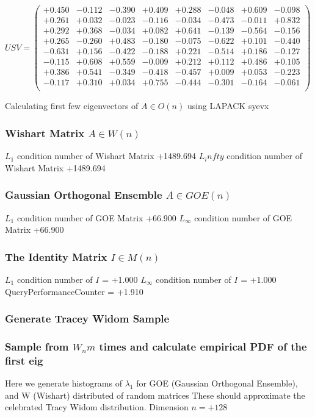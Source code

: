 \documentclass[9pt]{article}
\theoremstyle{plain}
\theoremstyle{definition}
\theoremstyle{remark}
\numberwithin{equation}{section}
\begin{document}
$U S V = \left(
\begin{array}{
cccccccc}
+0.450 & -0.112 & -0.390 & +0.409 & +0.288 & -0.048 & +0.609 & -0.098 \\
+0.261 & +0.032 & -0.023 & -0.116 & -0.034 & -0.473 & -0.011 & +0.832 \\
+0.292 & +0.368 & -0.034 & +0.082 & +0.641 & -0.139 & -0.564 & -0.156 \\
+0.265 & -0.260 & +0.483 & -0.180 & -0.075 & -0.622 & +0.101 & -0.440 \\
-0.631 & +0.156 & -0.422 & -0.188 & +0.221 & -0.514 & +0.186 & -0.127 \\
-0.115 & +0.608 & +0.559 & -0.009 & +0.212 & +0.112 & +0.486 & +0.105 \\
+0.386 & +0.541 & -0.349 & -0.418 & -0.457 & +0.009 & +0.053 & -0.223 \\
-0.117 & +0.310 & +0.034 & +0.755 & -0.444 & -0.301 & -0.164 & -0.061 \\
\end{array}
\right)$ \newline 

Calculating first few eigenvectors of $A \in O(n)$ using LAPACK syevx

\subsubsection{Wishart Matrix $A \in W(n)$}
$L_1$ condition number of Wishart Matrix +1489.694
$L_infty$ condition number of Wishart Matrix +1489.694
\subsubsection{Gaussian Orthogonal Ensemble $A \in GOE(n)$}
$L_1$ condition number of GOE Matrix +66.900
$L_\infty$ condition number of GOE Matrix +66.900
\subsubsection{The Identity Matrix $I \in M(n)$}
$L_1$ condition number of $I$ = +1.000
$L_\infty$ condition number of $I$ = +1.000
QueryPerformanceCounter  =  +1.910
\subsubsection{Generate Tracey Widom Sample}
\subsubsection{Sample from $W_n m$ times and calculate empirical PDF of the first eig}
Here we generate histograms of $\lambda_1$ for GOE (Gaussian Orthogonal Ensemble), and W (Wishart) 		 distributed of random matrices
These should approximate the celebrated Tracy Widom distribution.
Dimension $n = +128$
\end{document}
